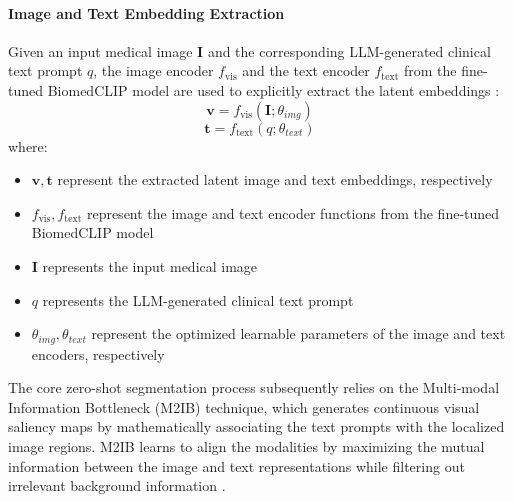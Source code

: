 \paragraph{Image and Text Embedding Extraction} Given an input medical image $\mathbf{I}$ and the corresponding LLM-generated clinical text prompt $q$, the image encoder $f_{\text{vis}}$ and the text encoder $f_{\text{text}}$ from the fine-tuned BiomedCLIP model are used to explicitly extract the latent embeddings \cite{medclipsam}:
\begin{equation}
\mathbf{v} = f_{\text{vis}}(\mathbf{I}; \theta_{img})
\end{equation}
\begin{equation}
\mathbf{t} = f_{\text{text}}(q; \theta_{text})
\end{equation}
where:
\begin{itemize}
\item $\mathbf{v}, \mathbf{t}$ represent the extracted latent image and text embeddings, respectively
\item $f_{\text{vis}}, f_{\text{text}}$ represent the image and text encoder functions from the fine-tuned BiomedCLIP model
\item $\mathbf{I}$ represents the input medical image
\item $q$ represents the LLM-generated clinical text prompt
\item $\theta_{img}, \theta_{text}$ represent the optimized learnable parameters of the image and text encoders, respectively
\end{itemize}

The core zero-shot segmentation process subsequently relies on the Multi-modal Information Bottleneck (M2IB) technique, which generates continuous visual saliency maps by mathematically associating the text prompts with the localized image regions. M2IB learns to align the modalities by maximizing the mutual information between the image and text representations while filtering out irrelevant background information \cite{medclipsam}.

